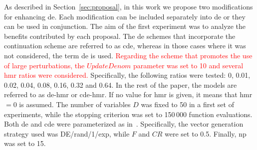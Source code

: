 \documentclass[review,3p]{elsarticle}
\newcommand{\CDE}{c{\sc de}}
\newcommand{\DE}{{\sc de}}
\newcommand{\HMR}{{\sc hmr}}
\newcommand{\NP}{{\sc np}}
\begin{document}
As described in Section~\ref{sec:proposal}, in this work we propose two modifications for enhancing \DE{}.
%
Each modification can be included separately into \DE{} or they can be used in conjunction.
%
The aim of the first experiment was to analyze the benefits contributed by each proposal.
%
The \DE{} schemes that incorporate the continuation scheme are referred to as \CDE{}, whereas in those cases where it
was not considered, the term \DE{} is used.
%
\textcolor{red}{
Regarding the scheme that promotes the use of large perturbations, the $UpdateDenom$ parameter was set to 10 and
several \HMR{} ratios were considered.
}
%
Specifically, the following ratios were tested: 0, 0.01, 0.02, 0.04, 0.08, 0.16, 0.32 and 0.64.
%
In the rest of the paper, the models are referred to as \DE{}-\HMR{} or \CDE{}-\HMR{}.
%
If no value for \HMR{} is given, it means that \HMR{} $ = 0$ is assumed.
%
The number of variables $D$ was fixed to 50 in a first set of experiments,
while the stopping criterion was set to 150$\,$000 function evaluations.
%
Both \DE{} and \CDE{} were parameterized as in~\cite{LaTorre:11}.
%
Specifically, the vector generation strategy used was DE/rand/1/exp, while
$F$ and $CR$ were set to 0.5.
%
Finally, \NP{} was set to 15.
\end{document}
